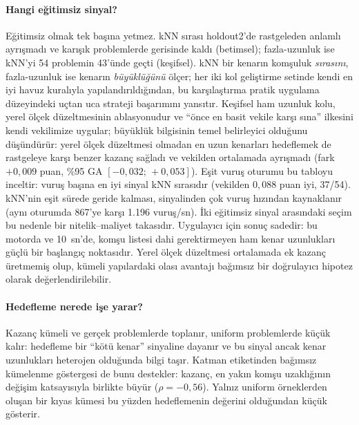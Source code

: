 \documentclass[pdflatex,sn-basic]{sn-jnl}
\begin{document}
\paragraph{Hangi eğitimsiz sinyal?}
Eğitimsiz olmak tek başına yetmez. kNN sırası holdout2'de rastgeleden anlamlı ayrışmadı ve karışık
problemlerde gerisinde kaldı (betimsel); fazla-uzunluk ise kNN'yi 54 problemin 43'ünde geçti
(keşifsel).
kNN bir kenarın komşuluk \emph{sırasını}, fazla-uzunluk ise kenarın \emph{büyüklüğünü} ölçer;
her iki kol geliştirme setinde kendi en iyi havuz kuralıyla yapılandırıldığından, bu karşılaştırma
pratik uygulama düzeyindeki uçtan uca strateji başarımını yansıtır.
Keşifsel ham uzunluk kolu, yerel ölçek düzeltmesinin ablasyonudur ve ``önce en basit vekile karşı sına'' ilkesini kendi vekilimize uygular;
büyüklük bilgisinin temel belirleyici olduğunu düşündürür: yerel ölçek düzeltmesi olmadan en uzun
kenarları hedeflemek de rastgeleye karşı benzer kazanç sağladı ve vekilden ortalamada ayrışmadı
(fark $+0{,}009$ puan, \%95 GA $[-0{,}032;\,+0{,}053]$).
Eşit vuruş oturumu bu tabloyu inceltir: vuruş başına en iyi sinyal kNN sırasıdır (vekilden
$0{,}088$ puan iyi, 37/54). kNN'nin eşit sürede geride kalması, sinyalinden çok vuruş hızından
kaynaklanır (aynı oturumda 867'ye karşı 1.196 vuruş/sn). İki eğitimsiz sinyal arasındaki seçim bu
nedenle bir nitelik--maliyet takasıdır.
Uygulayıcı için sonuç sadedir: bu motorda ve 10~sn'de, komşu listesi dahi gerektirmeyen ham kenar
uzunlukları güçlü bir başlangıç noktasıdır. Yerel ölçek düzeltmesi ortalamada ek kazanç üretmemiş
olup, kümeli yapılardaki olası avantajı bağımsız bir doğrulayıcı hipotez olarak değerlendirilebilir.

\paragraph{Hedefleme nerede işe yarar?}
Kazanç kümeli ve gerçek problemlerde toplanır, uniform problemlerde küçük kalır: hedefleme bir
``kötü kenar'' sinyaline dayanır ve bu sinyal ancak kenar uzunlukları heterojen olduğunda bilgi
taşır. Katman etiketinden bağımsız kümelenme göstergesi de bunu destekler: kazanç, en yakın komşu
uzaklığının değişim katsayısıyla birlikte büyür ($\rho=-0{,}56$).
Yalnız uniform örneklerden oluşan bir kıyas kümesi bu yüzden hedeflemenin değerini
olduğundan küçük gösterir.
\end{document}
